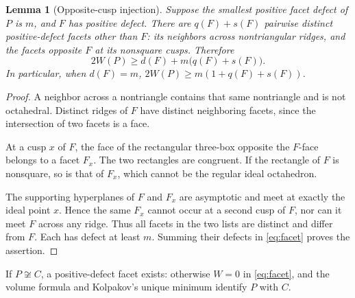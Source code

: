 \documentclass[11pt]{article}
\newtheorem{lemma}[theorem]{Lemma}
\begin{document}
\begin{lemma}[Opposite-cusp injection]\label{lem:injection}
Suppose the smallest positive facet defect of $P$ is $m$, and $F$ has
positive defect. There are $q(F)+s(F)$ pairwise distinct positive-defect
facets other than $F$: its neighbors across nontriangular ridges, and
the facets opposite $F$ at its nonsquare cusps. Therefore
\begin{equation}\label{eq:budget}
 2W(P)\ge d(F)+m\bigl(q(F)+s(F)\bigr).
\end{equation}
In particular, when $d(F)=m$,
$2W(P)\ge m(1+q(F)+s(F))$.
\end{lemma}
\begin{proof}
A neighbor across a nontriangle contains that same nontriangle and is
not octahedral. Distinct ridges of $F$ have distinct neighboring facets,
since the intersection of two facets is a face.

At a cusp $x$ of $F$, the face of the rectangular three-box opposite
the $F$-face belongs to a facet $F_x$. The two rectangles are congruent.
If the rectangle of $F$ is nonsquare, so is that of $F_x$, which cannot
be the regular ideal octahedron.

The supporting hyperplanes of $F$ and $F_x$ are asymptotic and meet
at exactly the ideal point $x$. Hence the same $F_x$ cannot occur at
a second cusp of $F$, nor can it meet $F$ across any ridge. Thus all
facets in the two lists are distinct and differ from $F$. Each has
defect at least $m$. Summing their defects in \eqref{eq:facet} proves
the assertion.
\end{proof}

If $P\not\cong C$, a positive-defect facet exists: otherwise $W=0$
in \eqref{eq:facet}, and the volume formula and Kolpakov's unique
minimum identify $P$ with $C$.
\end{document}
